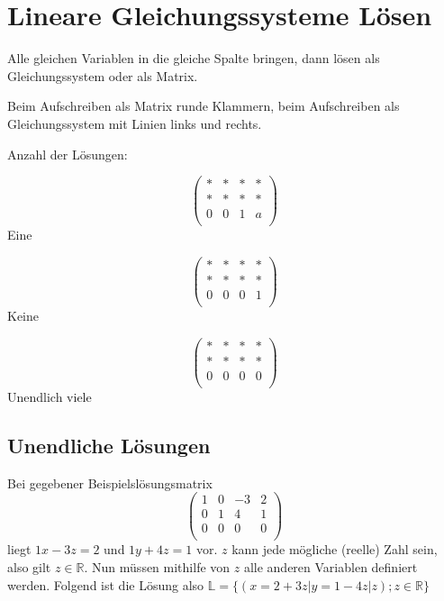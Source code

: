 \documentclass{article}
\begin{document}
  
\section{Lineare Gleichungssysteme Lösen}
Alle gleichen Variablen in die gleiche Spalte bringen, dann lösen als Gleichungssystem oder als Matrix.
 
Beim Aufschreiben als Matrix runde Klammern, beim Aufschreiben als Gleichungssystem mit Linien links und rechts.
 
Anzahl der Lösungen:
\begin{multicols}{3} 
\noindent 
\[
\begin{pmatrix}
  * & * & * & * \\
  * & * & * & * \\
  0 & 0 & 1 & a \\
\end{pmatrix}
\]
\centering Eine
 
\columnbreak 
\noindent 
\[
\begin{pmatrix}
  * & * & * & * \\
  * & * & * & * \\
  0 & 0 & 0 & 1 \\
\end{pmatrix}
\] 
\centering Keine
 
\columnbreak 
\noindent 
\[
\begin{pmatrix}
  * & * & * & * \\
  * & * & * & * \\
  0 & 0 & 0 & 0 \\
\end{pmatrix}
\] 
\centering Unendlich viele
 
\end{multicols}
 
\subsection{Unendliche Lösungen} 
Bei gegebener Beispielslösungsmatrix 
\[
\begin{pmatrix} 
  1 & 0 & -3 & 2 \\
  0 & 1 &  4 & 1 \\
  0 & 0 &  0 & 0 \\
\end{pmatrix}
\] 
liegt $1x-3z=2$ und $1y+4z=1$ vor. $z$ kann jede mögliche (reelle) Zahl sein, also gilt $z \in \mathbb{R}$. Nun müssen mithilfe von $z$ alle anderen Variablen definiert werden. Folgend ist die Lösung also $\mathbb{L}=\{(x=2+3z|y=1-4z|z);z \in \mathbb{R}\}$
 
\end{document}
